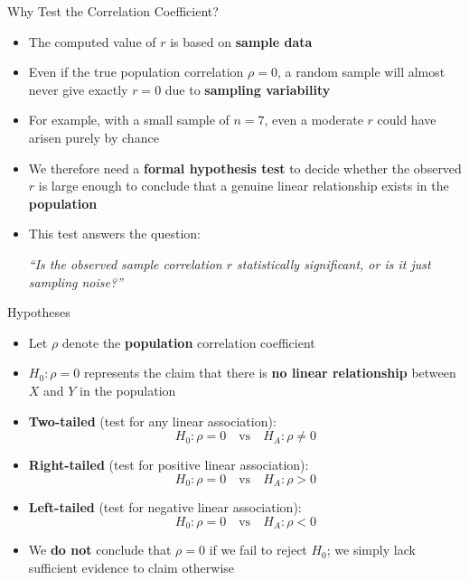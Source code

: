 \documentclass[12pt, aspectratio=169]{beamer}
\begin{document}
    \begin{frame}{Why Test the Correlation Coefficient?}
        \begin{itemize}
            \item The computed value of $r$ is based on \textbf{sample data}
            \item Even if the true population correlation $\rho = 0$, a random
                sample will almost never give exactly $r = 0$ due to
                \textbf{sampling variability}
            \item For example, with a small sample of $n = 7$, even a moderate
                $r$ could have arisen purely by chance
            \item We therefore need a \textbf{formal hypothesis test} to decide
                whether the observed $r$ is large enough to conclude that a genuine
                linear relationship exists in the \textbf{population}
            \item This test answers the question:
            \begin{center}
                \emph{``Is the observed sample correlation $r$ statistically
                significant, or is it just sampling noise?''}
            \end{center}
        \end{itemize}
    \end{frame}


    \begin{frame}{Hypotheses}
        \begin{itemize}
            \item Let $\rho$ denote the \textbf{population} correlation coefficient
            \item $H_0: \rho = 0$ represents the claim that there is
                \textbf{no linear relationship} between $X$ and $Y$ in the population
            \item \textbf{Two-tailed} (test for any linear association):
            \[
                H_0: \rho = 0 \quad \text{vs} \quad H_A: \rho \neq 0
            \]
            \item \textbf{Right-tailed} (test for positive linear association):
            \[
                H_0: \rho = 0 \quad \text{vs} \quad H_A: \rho > 0
            \]
            \item \textbf{Left-tailed} (test for negative linear association):
            \[
                H_0: \rho = 0 \quad \text{vs} \quad H_A: \rho < 0
            \]
            \item We \textbf{do not} conclude that $\rho = 0$ if we fail to
                reject $H_0$; we simply lack sufficient evidence to claim
                otherwise
        \end{itemize}
    \end{frame}
\end{document}
